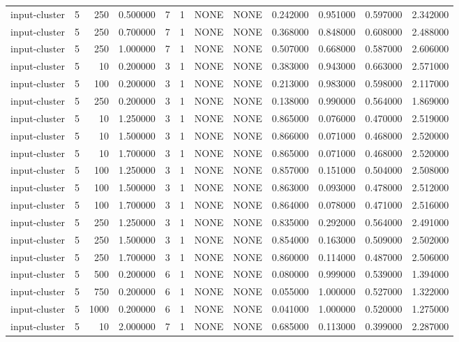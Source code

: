 \begin{tabular}{lrrrllllrrrr}
input-cluster & 5 & 250 & 0.500000 & 7 & 1 & NONE & NONE & 0.242000 & 0.951000 & 0.597000 & 2.342000 \\
input-cluster & 5 & 250 & 0.700000 & 7 & 1 & NONE & NONE & 0.368000 & 0.848000 & 0.608000 & 2.488000 \\
input-cluster & 5 & 250 & 1.000000 & 7 & 1 & NONE & NONE & 0.507000 & 0.668000 & 0.587000 & 2.606000 \\
input-cluster & 5 & 10 & 0.200000 & 3 & 1 & NONE & NONE & 0.383000 & 0.943000 & 0.663000 & 2.571000 \\
input-cluster & 5 & 100 & 0.200000 & 3 & 1 & NONE & NONE & 0.213000 & 0.983000 & 0.598000 & 2.117000 \\
input-cluster & 5 & 250 & 0.200000 & 3 & 1 & NONE & NONE & 0.138000 & 0.990000 & 0.564000 & 1.869000 \\
input-cluster & 5 & 10 & 1.250000 & 3 & 1 & NONE & NONE & 0.865000 & 0.076000 & 0.470000 & 2.519000 \\
input-cluster & 5 & 10 & 1.500000 & 3 & 1 & NONE & NONE & 0.866000 & 0.071000 & 0.468000 & 2.520000 \\
input-cluster & 5 & 10 & 1.700000 & 3 & 1 & NONE & NONE & 0.865000 & 0.071000 & 0.468000 & 2.520000 \\
input-cluster & 5 & 100 & 1.250000 & 3 & 1 & NONE & NONE & 0.857000 & 0.151000 & 0.504000 & 2.508000 \\
input-cluster & 5 & 100 & 1.500000 & 3 & 1 & NONE & NONE & 0.863000 & 0.093000 & 0.478000 & 2.512000 \\
input-cluster & 5 & 100 & 1.700000 & 3 & 1 & NONE & NONE & 0.864000 & 0.078000 & 0.471000 & 2.516000 \\
input-cluster & 5 & 250 & 1.250000 & 3 & 1 & NONE & NONE & 0.835000 & 0.292000 & 0.564000 & 2.491000 \\
input-cluster & 5 & 250 & 1.500000 & 3 & 1 & NONE & NONE & 0.854000 & 0.163000 & 0.509000 & 2.502000 \\
input-cluster & 5 & 250 & 1.700000 & 3 & 1 & NONE & NONE & 0.860000 & 0.114000 & 0.487000 & 2.506000 \\
input-cluster & 5 & 500 & 0.200000 & 6 & 1 & NONE & NONE & 0.080000 & 0.999000 & 0.539000 & 1.394000 \\
input-cluster & 5 & 750 & 0.200000 & 6 & 1 & NONE & NONE & 0.055000 & 1.000000 & 0.527000 & 1.322000 \\
input-cluster & 5 & 1000 & 0.200000 & 6 & 1 & NONE & NONE & 0.041000 & 1.000000 & 0.520000 & 1.275000 \\
input-cluster & 5 & 10 & 2.000000 & 7 & 1 & NONE & NONE & 0.685000 & 0.113000 & 0.399000 & 2.287000 \\

\end{tabular}
